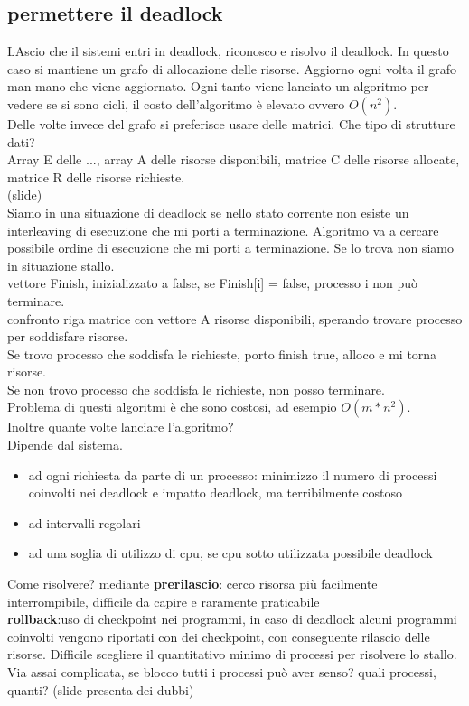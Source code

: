 \documentclass{article}
\begin{document}
\subsection{permettere il deadlock}
LAscio che il sistemi entri in deadlock, riconosco e risolvo il deadlock. In questo caso si mantiene un grafo di allocazione delle risorse. Aggiorno ogni volta il grafo man mano che viene aggiornato. 
Ogni tanto viene lanciato un algoritmo per vedere se si sono cicli, il costo dell'algoritmo è elevato ovvero $O(n^2)$.\\
Delle volte invece del grafo si preferisce usare delle matrici. Che tipo di strutture dati?\\
Array E delle ..., array A delle risorse disponibili, matrice C delle risorse allocate, matrice R delle risorse richieste.\\
(slide)\\
Siamo in una situazione di deadlock se nello stato corrente non esiste un interleaving di esecuzione che mi porti a terminazione. Algoritmo 
va a cercare possibile ordine di esecuzione che mi porti a terminazione. Se lo trova non siamo in situazione stallo.\\
vettore Finish, inizializzato a false, se Finish[i] = false, processo i non può terminare.\\
confronto riga matrice con vettore A risorse disponibili, sperando trovare processo per soddisfare risorse. \\
Se trovo processo che soddisfa le richieste, porto finish true, alloco e mi torna risorse.\\
Se non trovo processo che soddisfa le richieste, non posso terminare.\\
Problema di questi algoritmi è che sono costosi, ad esempio $O(m * n^2)$.\\
Inoltre quante volte lanciare l'algoritmo?\\
Dipende dal sistema. 
\begin{itemize}
    \item ad ogni richiesta da parte di un processo: minimizzo il numero di processi coinvolti nei deadlock e impatto deadlock, ma terribilmente costoso
    \item ad intervalli regolari
    \item ad una soglia di utilizzo di cpu, se cpu sotto utilizzata possibile deadlock
\end{itemize}

Come risolvere? mediante \textbf{prerilascio}: cerco risorsa più facilmente interrompibile, difficile da capire e raramente praticabile\\
\textbf{rollback}:uso di checkpoint nei programmi, in caso di deadlock alcuni programmi coinvolti vengono riportati con dei checkpoint, con conseguente 
rilascio delle risorse. Difficile scegliere il quantitativo minimo di processi per risolvere lo stallo. Via assai complicata, se blocco tutti i processi può aver senso?
quali processi, quanti? (slide presenta dei dubbi)\\
\end{document}
